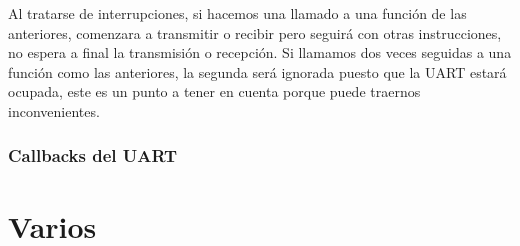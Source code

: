 \documentclass[a4paper,12pt]{report} %
\begin{document}
Al tratarse de interrupciones, si hacemos una llamado a una función de las anteriores, comenzara a transmitir o recibir pero seguirá con otras instrucciones, no espera a final la transmisión o recepción.
Si llamamos dos veces seguidas a una función como las anteriores, la segunda será ignorada puesto que la UART estará ocupada, este es un punto a tener en cuenta porque puede traernos inconvenientes.


\subsection{Callbacks del UART}













\chapter*{Varios}
\end{document}
